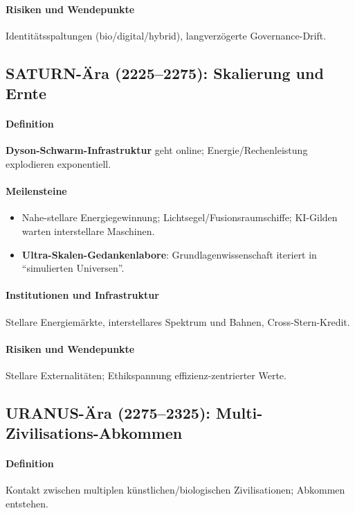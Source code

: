 \documentclass[11pt]{article}
\begin{document}
\paragraph{Risiken und Wendepunkte} Identitätsspaltungen (bio/digital/hybrid), langverzögerte Governance-Drift.

\subsection{SATURN-Ära (2225–2275): Skalierung und Ernte}
\paragraph{Definition} \textbf{Dyson-Schwarm-Infrastruktur} geht online; Energie/Rechenleistung explodieren exponentiell.

\paragraph{Meilensteine}
\begin{itemize}[noitemsep]
  \item Nahe-stellare Energiegewinnung; Lichtsegel/Fusionsraumschiffe; KI-Gilden warten interstellare Maschinen.
  \item \textbf{Ultra-Skalen-Gedankenlabore}: Grundlagenwissenschaft iteriert in ``simulierten Universen''.
\end{itemize}

\paragraph{Institutionen und Infrastruktur} Stellare Energiemärkte, interstellares Spektrum und Bahnen, Cross-Stern-Kredit.

\paragraph{Risiken und Wendepunkte} Stellare Externalitäten; Ethikspannung effizienz-zentrierter Werte.

\subsection{URANUS-Ära (2275–2325): Multi-Zivilisations-Abkommen}
\paragraph{Definition} Kontakt zwischen multiplen künstlichen/biologischen Zivilisationen; Abkommen entstehen.
\end{document}
